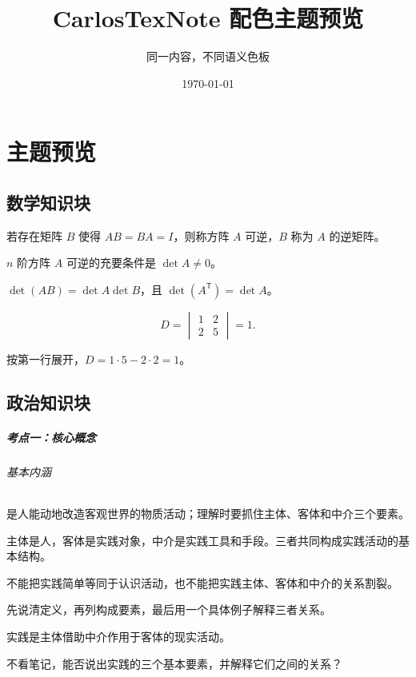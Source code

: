 \documentclass[theme=ocean]{CarlosTexNote}
\title{CarlosTexNote 配色主题预览}
\author{同一内容，不同语义色板}
\date{\today}
\begin{document}
\maketitle
\chapter{主题预览}
\section{数学知识块}
\begin{definition}[矩阵可逆]
若存在矩阵 $B$ 使得 $AB=BA=I$，则称方阵 $A$ 可逆，$B$ 称为 $A$ 的逆矩阵。
\end{definition}
\begin{theorem}[可逆判定]
$n$ 阶方阵 $A$ 可逆的充要条件是 $\det A\ne 0$。
\end{theorem}
\begin{property}[行列式]
$\det(AB)=\det A\det B$，且 $\det(A^{\mathsf T})=\det A$。
\end{property}
\begin{example}[行列式计算]
\[
D=\begin{vmatrix}1&2\\2&5\end{vmatrix}=1.
\]
\end{example}
\begin{solution}
按第一行展开，$D=1\cdot5-2\cdot2=1$。
\end{solution}
\section{政治知识块}
\paragraph{考点一：核心概念}
\subparagraph{基本内涵}  是人能动地改造客观世界的物质活动；理解时要抓住主体、客体和中介三个要素。
\begin{keybox}[背诵锚点]
主体是人，客体是实践对象，中介是实践工具和手段。三者共同构成实践活动的基本结构。
\end{keybox}
\begin{warningbox}[易错辨析]
不能把实践简单等同于认识活动，也不能把实践主体、客体和中介的关系割裂。
\end{warningbox}
\begin{methodbox}[复习方法]
先说清定义，再列构成要素，最后用一个具体例子解释三者关系。
\end{methodbox}
\begin{summarybox}[一句话总结]
实践是主体借助中介作用于客体的现实活动。
\end{summarybox}
\begin{recallbox}[闭卷提取]
不看笔记，能否说出实践的三个基本要素，并解释它们之间的关系？
\end{recallbox}
\end{document}
